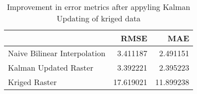 \begin{table}
\caption{Improvement in error metrics after appyling Kalman Updating of kriged data}
\label{tab:oahu5_lidar_error}
\begin{tabular}{lrr}
\toprule
 & RMSE & MAE \\
\midrule
Naive Bilinear Interpolation & 3.411187 & 2.491151 \\
Kalman Updated Raster & 3.392221 & 2.395223 \\
Kriged Raster & 17.619021 & 11.899238 \\
\bottomrule
\end{tabular}
\end{table}
